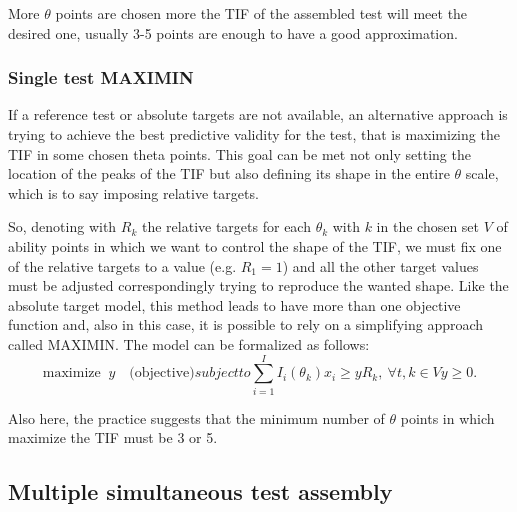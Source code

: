 More $\theta$ points are chosen more the TIF of the assembled test will meet the desired one, usually 3-5 points are enough to have a good approximation.

\subsubsection{Single test MAXIMIN}\label{sec:single-test-maximin}
If a reference test or absolute targets are not available, an alternative approach is trying to achieve the best predictive validity for the test, that is maximizing the TIF in some chosen theta points. This goal can be met not only setting the location of the peaks of the TIF but also defining its shape in the entire $\theta$ scale, which is to say imposing relative targets.

So, denoting with $R_k$ the relative targets for each $\theta_k$ with $k$ in the chosen set $V$ of ability points in which we want to control the shape of the TIF, we must fix one of the relative targets to a value (e.g. $R_1=1$) and all the other target values must be adjusted correspondingly trying to reproduce the wanted shape. Like the absolute target model, this method leads to have more than one objective function and, also in this case, it is possible to rely on a simplifying approach called MAXIMIN. The model can be formalized as follows:
\begin{subequations}\label{eq:MAXIMIN}
	\begin{equation}
	\mbox{maximize } \ y \quad \mbox{(objective)}
	\end{equation}
	subject to
	\begin{equation}\label{eq:SMAXIMIN1}
	\sum_{i=1}^I I_i(\theta_{k}) x_{i} \ge yR_{k}, \ \forall t,k \in V
	\end{equation}
	\begin{equation*}
	y \ge 0.
	\end{equation*}
	\label{eq:SMAXIMIN}
\end{subequations}

\noindent Also here, the practice suggests that the minimum number of $\theta$ points in which maximize the TIF must be 3 or 5.

\subsection{Multiple simultaneous test assembly}\label{sec:multiple-test-assembly}

